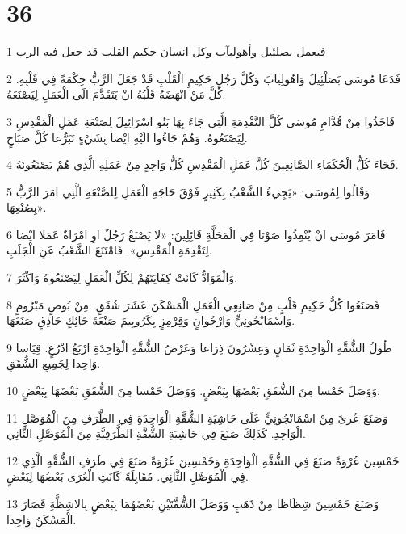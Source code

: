 \chapter{36}

\par 1 فيعمل بصلئيل وأهوليآب وكل انسان حكيم القلب قد جعل فيه الرب
\par 2 فَدَعَا مُوسَى بَصَلْئِيلَ وَاهُولِيابَ وَكُلَّ رَجُلٍ حَكِيمِ الْقَلْبِ قَدْ جَعَلَ الرَّبُّ حِكْمَةً فِي قَلْبِهِ. كُلَّ مَنْ انْهَضَهُ قَلْبُهُ انْ يَتَقَدَّمَ الَى الْعَمَلِ لِيَصْنَعَهُ.
\par 3 فَاخَذُوا مِنْ قُدَّامِ مُوسَى كُلَّ التَّقْدِمَةِ الَّتِي جَاءَ بِهَا بَنُو اسْرَائِيلَ لِصَنْعَةِ عَمَلِ الْمَقْدِسِ لِيَصْنَعُوهُ. وَهُمْ جَاءُوا الَيْهِ ايْضا بِشَيْءٍ تَبَرُّعا كُلَّ صَبَاحٍ.
\par 4 فَجَاءَ كُلُّ الْحُكَمَاءِ الصَّانِعِينَ كُلَّ عَمَلِ الْمَقْدِسِ كُلُّ وَاحِدٍ مِنْ عَمَلِهِ الَّذِي هُمْ يَصْنَعُونَهُ.
\par 5 وَقَالُوا لِمُوسَى: «يَجِيءُ الشَّعْبُ بِكَثِيرٍ فَوْقَ حَاجَةِ الْعَمَلِ لِلصَّنْعَةِ الَّتِي امَرَ الرَّبُّ بِصُنْعِهَا».
\par 6 فَامَرَ مُوسَى انْ يُنْفِذُوا صَوْتا فِي الْمَحَلَّةِ قَائِلِينَ: «لا يَصْنَعْ رَجُلٌ اوِ امْرَاةٌ عَمَلا ايْضا لِتَقْدِمَةِ الْمَقْدِسِ». فَامْتَنَعَ الشَّعْبُ عَنِ الْجَلَبِ.
\par 7 وَالْمَوَادُّ كَانَتْ كِفَايَتَهُمْ لِكُلِّ الْعَمَلِ لِيَصْنَعُوهُ وَاكْثَرَ.
\par 8 فَصَنَعُوا كُلُّ حَكِيمِ قَلْبٍ مِنْ صَانِعِي الْعَمَلِ الْمَسْكَنَ عَشَرَ شُقَقٍ. مِنْ بُوصٍ مَبْرُومٍ وَاسْمَانْجُونِيٍّ وَارْجُوانٍ وَقِرْمِزٍ بِكَرُوبِيمَ صَنْعَةَ حَائِكٍ حَاذِقٍ صَنَعَهَا.
\par 9 طُولُ الشُّقَّةِ الْوَاحِدَةِ ثَمَانٍ وَعِشْرُونَ ذِرَاعا وَعَرْضُ الشُّقَّةِ الْوَاحِدَةِ ارْبَعُ اذْرُعٍ. قِيَاسا وَاحِدا لِجَمِيعِ الشُّقَقِ.
\par 10 وَوَصَلَ خَمْسا مِنَ الشُّقَقِ بَعْضَهَا بِبَعْضٍ. وَوَصَلَ خَمْسا مِنَ الشُّقَقِ بَعْضَهَا بِبَعْضٍ.
\par 11 وَصَنَعَ عُرىً مِنْ اسْمَانْجُونِيٍّ عَلَى حَاشِيَةِ الشُّقَّةِ الْوَاحِدَةِ فِي الطَّرَفِ مِنَ الْمُوَصَّلِ الْوَاحِدِ. كَذَلِكَ صَنَعَ فِي حَاشِيَةِ الشُّقَّةِ الطَّرَفِيَّةِ مِنَ الْمُوَصَّلِ الثَّانِي.
\par 12 خَمْسِينَ عُرْوَةً صَنَعَ فِي الشُّقَّةِ الْوَاحِدَةِ وَخَمْسِينَ عُرْوَةً صَنَعَ فِي طَرَفِ الشُّقَّةِ الَّذِي فِي الْمُوَصَّلِ الثَّانِي. مُقَابِلَةً كَانَتِ الْعُرَى بَعْضُهَا لِبَعْضٍ.
\par 13 وَصَنَعَ خَمْسِينَ شِظَاظا مِنْ ذَهَبٍ وَوَصَلَ الشُّقَّتَيْنِ بَعْضَهُمَا بِبَعْضٍ بِالاشِظَّةِ فَصَارَ الْمَسْكَنُ وَاحِدا.
